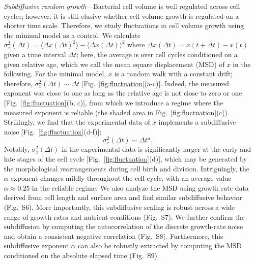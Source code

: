 \documentclass[aps, prl, twocolumn, longbibliography, linenumbers, superscriptaddress]{revtex4-2}
\begin{document}
{\it Subdiffusive random growth---}Bacterial cell volume is well regulated across cell cycles; however, it is still elusive whether cell volume growth is regulated on a shorter time scale. Therefore, we study fluctuations in cell volume growth using the minimal model as a control. We calculate $\sigma_x^2(\Delta t)= \langle \Delta x(\Delta t)^2\rangle- \langle \Delta x(\Delta t)\rangle^2$ where $\Delta x(\Delta t)= x(t+\Delta t)-x(t)$ given a time interval $\Delta t$; here, the average is over cell cycles conditioned on a given relative age, which we call the mean square displacement (MSD) of $x$ in the following. For the minimal model, $x$ is a random walk with a constant drift; therefore, $\sigma^2_x(\Delta t) \sim \Delta t$ [Fig.~\ref{fig:fluctuation}(a-c)]. Indeed, the measured exponent was close to one as long as the relative age is not close to zero or one [Fig.~\ref{fig:fluctuation}(b, c)], from which we introduce a regime where the measured exponent is reliable (the shaded area in Fig.~\ref{fig:fluctuation}(c)). Strikingly, we find that the experimental data of $x$ implements a subdiffusive noise [Fig.~\ref{fig:fluctuation}(d-f)]:
\begin{equation}
	\sigma^2_x (\Delta t) \sim \Delta t^{\alpha}.
	\label{eq:anomalous_exponenMukherjee2025bacterialt}
\end{equation}
Notably, $\sigma^2_x(\Delta t)$ in the experimental data is significantly larger at the early and late stages of the cell cycle [Fig.~\ref{fig:fluctuation}(d)], which may be generated by the morphological rearrangements during cell birth and division. Intriguingly, the $\alpha$ exponent changes mildly throughout the cell cycle, with an average value $\alpha\approx 0.25$ in the reliable regime. We also analyze the MSD using growth rate data derived from cell length and surface area and find similar subdiffusive behavior (Fig.~S6). More importantly, this subdiffusive scaling is robust across a wide range of growth rates and nutrient conditions (Fig.~S7).  We further confirm the subdiffusion by computing the autocorrelation of the discrete growth-rate noise and obtain a consistent negative correlation (Fig.~S8). Furthermore, this subdiffusive exponent $\alpha$ can also be robustly extracted by computing the MSD conditioned on the absolute elapsed time (Fig.~S9).
\end{document}
